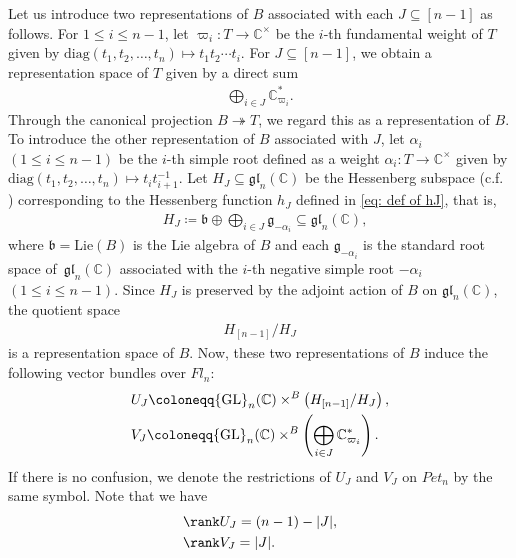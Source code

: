 Let us introduce two representations of $B$ associated with each $J\subseteq [n-1]$ as follows. For $1\le i\le n-1$, let $\varpi_i\colon T\rightarrow {\mathbb C}^{\times}$ be the $i$-th fundamental weight of $T$ given by $\text{diag}(t_1,t_2,\ldots,t_n)\mapsto t_1t_2\cdots t_i$. For $J\subseteq [n-1]$, we obtain a representation space of $T$ given by a direct sum
\begin{align*}
\bigoplus_{i\in J} {\mathbb C}_{\varpi_i}^*.
\end{align*}
Through the canonical projection $B\twoheadrightarrow T$, we regard this as a representation of $B$. To introduce the other representation of $B$ associated with $J$, 
let $\alpha_i$ $(1\le i\le n-1)$ be the $i$-th simple root defined as a weight $\alpha_i\colon T\rightarrow {\mathbb C}^{\times}$ given by $\text{diag}(t_1,t_2,\ldots,t_n)\mapsto t_{i}t_{i+1}^{-1}$. Let $H_J\subseteq \mathfrak{gl}_n({\mathbb C})$ be the Hessenberg subspace (c.f. \cite[Sect.~2]{ty}) corresponding to the Hessenberg function $h_J$ defined in \eqref{eq: def of hJ}, that is,
\begin{align}\label{eq: HJ}
&H_{J} \coloneqq \mathfrak{b}\oplus\bigoplus_{i\in J} \mathfrak{g}_{-\alpha_i} \subseteq \mathfrak{gl}_n({\mathbb C}),
\end{align}
where $\mathfrak{b}=\text{Lie}(B)$ is the Lie algebra of $B$ and each $\mathfrak{g}_{-\alpha_{i}}$ is the standard root space of~$\mathfrak{gl}_n({\mathbb C})$ associated with the $i$-th negative simple root $-\alpha_i$ $(1\le i\le n-1)$. Since $H_J$ is preserved by the adjoint action of $B$ on $\mathfrak{gl}_n({\mathbb C})$, the quotient space
\begin{align*}
H_{[n-1]}/H_J
\end{align*}
is a representation space of $B$. Now, these two representations of $B$ induce the following vector bundles over $Fl_n$: 
\begin{align*}
&U_{J} 
\coloneqq {\rm GL}_n({\mathbb C})\times^B \left(H_{[n-1]}/H_J\right), \\
&V_{J} 
\coloneqq {\rm GL}_n({\mathbb C})\times^B \left(\bigoplus_{i\in J} {\mathbb C}_{\varpi_i}^*\right).
\end{align*}
If there is no confusion, we denote the restrictions of $U_{J}$ and $V_{J}$ on $Pet_{n}$ by the same symbol. Note that we have
\begin{equation}
\begin{split}\label{eq: rank of U and J}
&\rank U_{J}=(n-1)-|J|, \\
&\rank V_{J}=|J|.
\end{split}
\end{equation}

